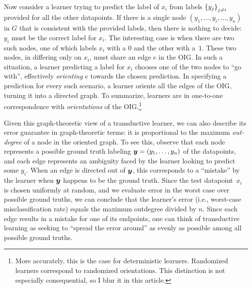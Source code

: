   
  Now consider a learner trying to predict the label of $x_i$ from labels $\left\{ y_j \right\}_{j \neq i}$ provided for all the other datapoints. If there is a single node $(y_1, \ldots, y_i, \ldots, y_n)$  in $G$ that is consistent with the provided labels, then there is nothing to decide: $y_i$ must be the correct label for $x_i$. The interesting case is when there are two such nodes, one of which labels $x_i$ with a $0$ and the other with a~$1$. These two nodes, in differing only on $x_i$, must share an edge $e$ in the OIG. In such a situation, a learner predicting a label for $x_i$ chooses one of the two nodes to ``go with'', effectively \emph{orienting} $e$   towards the chosen prediction. In specifying a prediction for every such scenario, a learner orients all the edges of the OIG, turning it into a directed graph.  %
To summarize, learners are  in one-to-one correspondence with \emph{orientations} of the OIG.\footnote{More accurately, this is the case for deterministic learners. Randomized learners correspond to randomized orientations. This distinction is not especially consequential, so I blur it in this article.} 

Given this graph-theoretic view of a transductive learner, we can also describe its error guarantee  in graph-theoretic terms: it is proportional to the maximum \emph{out-degree} of a node in the oriented graph. To see this, observe that each node  represents a possible ground truth labeling $\boldsymbol{ y }=(y_1, \ldots, y_n)$ of the datapoints, and each edge represents an ambiguity faced by the learner looking to predict some $y_i$. When an edge is directed out of $\boldsymbol{ y }$, this corresponds to a ``mistake'' by the learner when $\boldsymbol{ y }$ happens to be the ground truth. Since the test datapoint~$x_i$ is chosen uniformly at random, and we evaluate error in the worst case over possible ground truths, we can conclude that the learner's error (i.e., worst-case misclassification rate) equals the maximum outdegree divided by $n$. Since each edge results in a mistake for one of its endpoints, one can think of transductive learning as seeking to ``spread the error around'' as evenly as possible among all possible ground truths.



